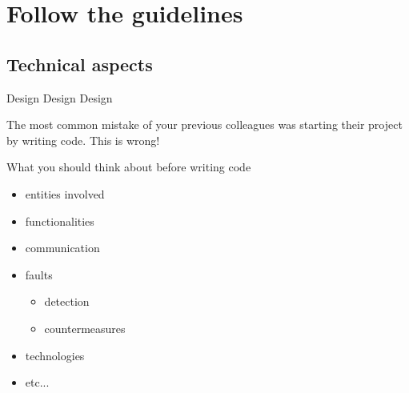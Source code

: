\documentclass[presentation]{beamer}\mode<presentation>{\usetheme{AMSBolognaFC}}
\begin{document}
\section{Follow the guidelines}
\subsection{Technical aspects}

\begin{frame}[c,allowframebreaks]{Design Design Design}
    

    The most common mistake of your previous colleagues was starting their project by writing code.
    \alert{This is wrong!}
   
     \begin{block}{What you should think about before writing code}
        \begin{itemize}
            \item entities involved
            \item functionalities
            \item communication
            \item \alert{faults}
            \begin{itemize}
                \item detection
                \item countermeasures
            \end{itemize}
            \item technologies
            \item etc...
        \end{itemize}
    \end{block}
    

\end{frame}
\end{document}
